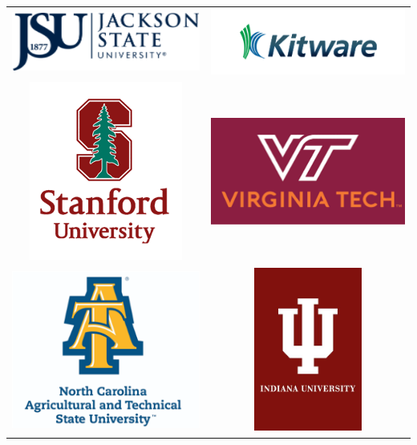 \documentclass[landscape,a0paper,fontscale=0.285]{baposter} %
\begin{document}
\begin{poster}
{\begin{tabular}{c c}
\includegraphics[scale=0.2]{logos/jsu.png} &
\includegraphics[scale=0.2]{logos/kitware.png} \\
\includegraphics[scale=0.2]{logos/stanford.png} &
\includegraphics[scale=0.2]{logos/vt.png} \\
\includegraphics[scale=0.2]{logos/ncatnt.png} &
\includegraphics[scale=0.2]{logos/iu.png} \\

\end{tabular}}
\end{poster}
\end{document}
